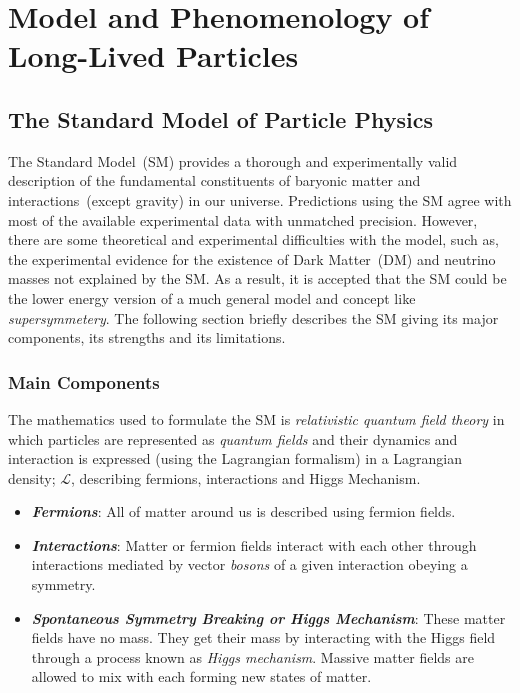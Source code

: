 
\chapter{Model and Phenomenology of Long-Lived Particles}
\label{Long_Lived_Particle_physics_chapter}


\section{The Standard Model of Particle Physics}
The Standard Model~(SM) provides a thorough and experimentally valid description of the fundamental constituents of baryonic matter and interactions~(except gravity) in our universe. Predictions using the SM agree with most of the available experimental data with unmatched precision.
However, there are some theoretical and experimental difficulties with the model, such as, the experimental evidence for the existence of Dark Matter~(DM) and neutrino masses not explained by the SM.  As a result, it is accepted that the SM could be the lower energy version of a much general model and concept like \textit{supersymmetery}.
The following section briefly describes the SM giving its major  components, its strengths and its limitations.
\subsection{Main Components}
The mathematics used to formulate the SM is \textit{relativistic quantum field theory} in which particles are represented as \textit{quantum fields} and their dynamics and interaction is expressed (using the Lagrangian formalism) in a Lagrangian density; $\mathcal{L}$, describing fermions, interactions and Higgs Mechanism.

\begin{itemize}
\item \textbf{\textit{Fermions}}: All of matter around us is described using fermion fields.
\item \textbf{\textit{Interactions}}: Matter or fermion fields interact with each other through interactions mediated by vector \textit{bosons} of a given interaction obeying a symmetry.
\item \textbf{\textit{Spontaneous Symmetry Breaking or Higgs Mechanism}}: These matter fields have no mass. They get their mass by interacting with the Higgs field through a process known as \textit{Higgs mechanism}. Massive matter fields are allowed to mix with each forming new states of matter.

\end{itemize}
